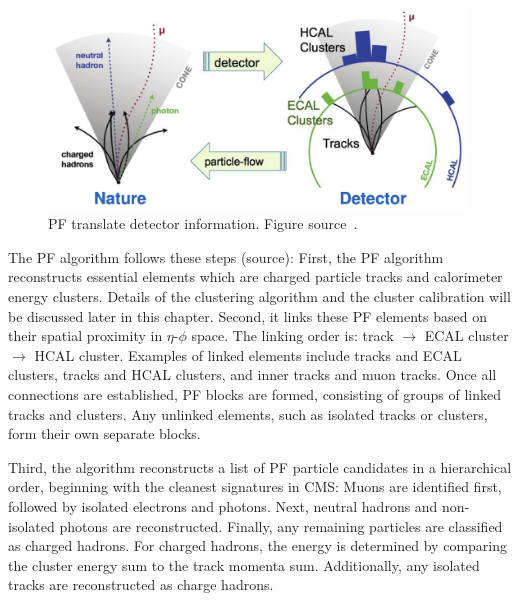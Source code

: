 \begin{figure}[t!]
\centering
\includegraphics[width=0.99\textwidth]{figures/PF.png}
\caption[PF translate detector information]{PF translate detector information. Figure source~\cite{}.}
\label{fig:PF_diagram}
\end{figure}

The PF algorithm follows these steps (source):
First, the PF algorithm reconstructs essential elements which are charged particle tracks and calorimeter energy clusters.
Details of the clustering algorithm and the cluster calibration will be discussed later in this chapter.
Second, it links these PF elements based on their spatial proximity in $\eta$-$\phi$ space.
The linking order is: track $\rightarrow$ ECAL cluster $\rightarrow$ HCAL cluster.
Examples of linked elements include tracks and ECAL clusters, tracks and HCAL clusters, and inner tracks and muon tracks.
Once all connections are established, PF blocks are formed, consisting of groups of linked tracks and clusters.
Any unlinked elements, such as isolated tracks or clusters, form their own separate blocks.

Third, the algorithm reconstructs a list of PF particle candidates in a hierarchical order, beginning with the cleanest signatures in CMS:
Muons are identified first, followed by isolated electrons and photons. Next, neutral hadrons and non-isolated photons are reconstructed.
Finally, any remaining particles are classified as charged hadrons.
For charged hadrons, the energy is determined by comparing the cluster energy sum to the track momenta sum.
Additionally, any isolated tracks are reconstructed as charge hadrons.

